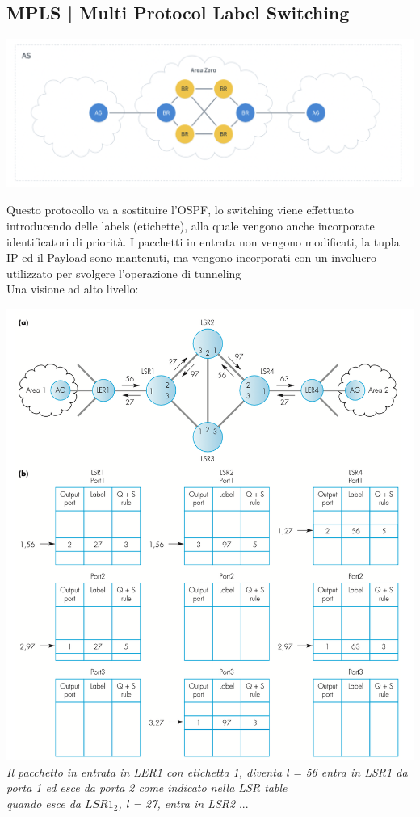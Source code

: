 \documentclass[11pt, oneside]{article}   	%
\begin{document}
\subsection*{MPLS | Multi Protocol Label Switching}
\begin{center}
\includegraphics[scale=0.5]{mpls}
\end{center}
Questo protocollo va a sostituire l'OSPF, lo switching viene effettuato introducendo delle labels (etichette), alla quale vengono anche incorporate identificatori di priorità. I pacchetti in entrata non vengono modificati, la tupla IP ed il Payload sono mantenuti, ma vengono incorporati con un involucro utilizzato per svolgere l'operazione di tunneling\\
Una visione ad alto livello:
\begin{center}
\includegraphics[scale=0.5]{etichettatore}\\
\emph{Il pacchetto in entrata in LER1 con etichetta 1, diventa l = 56 entra in LSR1 da porta 1 ed esce da porta 2 come indicato nella LSR table}\\
\emph{quando esce da $LSR1_2$, l = 27, entra in LSR2} ...  
\end{center}
\end{document}
